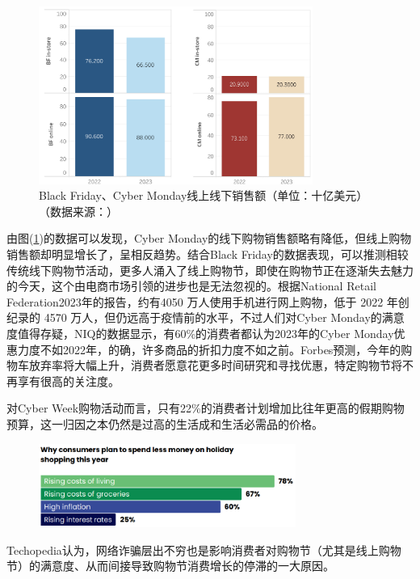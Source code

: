\documentclass[12pt]{ctexart}
\begin{document}
\begin{figure}[htbp!]
    \centering
    \includegraphics[width=0.8\textwidth]{Images/9.png}
    \caption{Black Friday、Cyber Monday线上线下销售额（单位：十亿美元）（数据来源：\cite{9,11}）}
    \label{BFandCM}
\end{figure}

由图(\ref{BFandCM})的数据可以发现，Cyber Monday的线下购物销售额略有降低，但线上购物销售额却明显增长了，呈相反趋势。结合Black Friday的数据表现，可以推测相较传统线下购物节活动，更多人涌入了线上购物节，即使在购物节正在逐渐失去魅力的今天，这个由电商市场引领的进步也是无法忽视的。根据National Retail Federation2023年的报告，约有4050 万人使用手机进行网上购物，低于 2022 年创纪录的 4570 万人，但仍远高于疫情前的水平，不过人们对Cyber Monday的满意度值得存疑，NIQ的数据显示，有60\%的消费者都认为2023年的Cyber Monday优惠力度不如2022年，的确，许多商品的折扣力度不如之前。Forbes预测，今年的购物车放弃率将大幅上升，消费者愿意花更多时间研究和寻找优惠\cite{11}，特定购物节将不再享有很高的关注度。

对Cyber Week购物活动而言，只有22\%的消费者计划增加比往年更高的假期购物预算\cite{12}，这一归因之本仍然是过高的生活成和生活必需品的价格。

\begin{figure}[htbp!]
    \centering
    \includegraphics[width=0.75\textwidth]{Images/11.png}
\end{figure}

Techopedia认为，网络诈骗层出不穷也是影响消费者对购物节（尤其是线上购物节）的满意度、从而间接导致购物节消费增长的停滞的一大原因。
\end{document}
